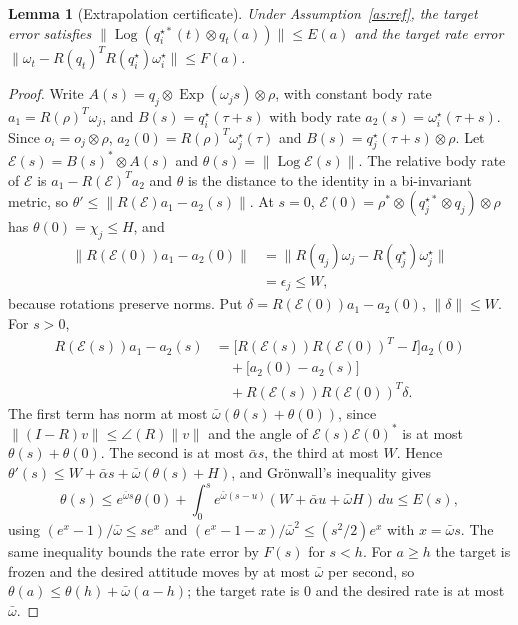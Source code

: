 \documentclass[journal]{IEEEtran}
\DeclareMathOperator{\Log}{Log}
\DeclareMathOperator{\Exp}{Exp}
\newtheorem{lemma}{Lemma}
\begin{document}
\begin{lemma}[Extrapolation certificate]\label{lem:ext}
Under Assumption~\ref{as:ref}, the target error satisfies $\|\Log(q_i^{\star*}(t)\otimes q_t(a))\|\le E(a)$ and the target rate error $\|\omega_t-R(q_t)^TR(q_i^\star)\omega_i^\star\|\le F(a)$.
\end{lemma}
\begin{proof}
Write $A(s)=q_j\otimes\Exp(\omega_js)\otimes\rho$, with constant body rate $a_1=R(\rho)^T\omega_j$, and $B(s)=q_i^\star(\tau+s)$ with body rate $a_2(s)=\omega_i^\star(\tau+s)$. Since $o_i=o_j\otimes\rho$, $a_2(0)=R(\rho)^T\omega_j^\star(\tau)$ and $B(s)=q_j^\star(\tau+s)\otimes\rho$. Let $\mathcal E(s)=B(s)^*\otimes A(s)$ and $\theta(s)=\|\Log\mathcal E(s)\|$. The relative body rate of $\mathcal E$ is $a_1-R(\mathcal E)^Ta_2$ and $\theta$ is the distance to the identity in a bi-invariant metric, so $\theta'\le\|R(\mathcal E)a_1-a_2(s)\|$. At $s=0$, $\mathcal E(0)=\rho^*\otimes(q_j^{\star*}\otimes q_j)\otimes\rho$ has $\theta(0)=\chi_j\le H$, and
\begin{equation}
\begin{aligned}\|R(\mathcal E(0))a_1-a_2(0)\|&=\|R(q_j)\omega_j-R(q_j^\star)\omega_j^\star\|\\&=\epsilon_j\le W,\end{aligned}
\end{equation}
because rotations preserve norms. Put $\delta=R(\mathcal E(0))a_1-a_2(0)$, $\|\delta\|\le W$. For $s>0$,
\begin{equation}
\begin{aligned}R(\mathcal E(s))a_1-a_2(s)&=\big[R(\mathcal E(s))R(\mathcal E(0))^T-I\big]a_2(0)\\&\quad+\big[a_2(0)-a_2(s)\big]\\&\quad+R(\mathcal E(s))R(\mathcal E(0))^T\delta.\end{aligned}
\end{equation}
The first term has norm at most $\bar\omega(\theta(s)+\theta(0))$, since $\|(I-R)v\|\le\angle(R)\|v\|$ and the angle of $\mathcal E(s)\mathcal E(0)^*$ is at most $\theta(s)+\theta(0)$. The second is at most $\bar\alpha s$, the third at most $W$. Hence $\theta'(s)\le W+\bar\alpha s+\bar\omega(\theta(s)+H)$, and Gr\"onwall's inequality gives
\begin{equation}
\theta(s)\le e^{\bar\omega s}\theta(0)+\!\int_0^s\!e^{\bar\omega(s-u)}(W+\bar\alpha u+\bar\omega H)\,du\le E(s),
\end{equation}
using $(e^x-1)/\bar\omega\le s e^{x}$ and $(e^x-1-x)/\bar\omega^2\le (s^2/2)e^{x}$ with $x=\bar\omega s$. The same inequality bounds the rate error by $F(s)$ for $s<h$. For $a\ge h$ the target is frozen and the desired attitude moves by at most $\bar\omega$ per second, so $\theta(a)\le\theta(h)+\bar\omega(a-h)$; the target rate is $0$ and the desired rate is at most $\bar\omega$.
\end{proof}
\end{document}

